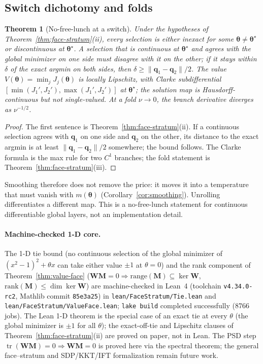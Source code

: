 \documentclass[conference]{IEEEtran}
\newtheorem{theorem}{Theorem}
\newcommand{\tr}{\operatorname{tr}}
\newcommand{\bq}{\bm{q}}
\newcommand{\bth}{\bm{\theta}}
\newcommand{\bW}{\bm{W}}
\newcommand{\bM}{\bm{M}}
\begin{document}
\subsection{Switch dichotomy and folds}
\begin{theorem}[No-free-lunch at a switch]
\label{thm:nfl}
Under the hypotheses of Theorem~\ref{thm:face-stratum}(ii), every selection is either inexact for some $\bth\ne\bth^\star$ or discontinuous at $\bth^\star$. A selection that is continuous at $\bth^\star$ and agrees with the global minimizer on one side must disagree with it on the other; if it stays within $\delta$ of the exact argmin on both sides, then $\delta\ge\|\bq_1-\bq_2\|/2$. The value $V(\bth)=\min_jJ_j(\bth)$ is locally Lipschitz, with Clarke subdifferential $[\min(J_1',J_2'),\max(J_1',J_2')]$ at $\bth^\star$; the solution map is Hausdorff-continuous but not single-valued. At a fold $\nu\to0$, the branch derivative diverges as $\nu^{-1/2}$.
\end{theorem}
\begin{proof}
The first sentence is Theorem~\ref{thm:face-stratum}(ii). If a continuous selection agrees with $\bq_1$ on one side and $\bq_2$ on the other, its distance to the exact argmin is at least $\|\bq_1-\bq_2\|/2$ somewhere; the bound follows. The Clarke formula is the max rule for two $C^1$ branches; the fold statement is Theorem~\ref{thm:face-stratum}(iii).
\end{proof}
Smoothing therefore does not remove the price: it moves it into a temperature that must vanish with $m(\bth)$ (Corollary~\ref{cor:smoothing}). Unrolling differentiates a different map. This is a no-free-lunch statement for continuous differentiable global layers, not an implementation detail.

\paragraph{Machine-checked 1-D core.} The 1-D tie bound (no continuous selection of the global minimizer of $(x^2-1)^2+\theta x$ can take either value $\pm1$ at $\theta=0$) and the rank component of Theorem~\ref{thm:value-face} ($\bW\bM=0\Rightarrow\mathrm{range}(\bM)\subseteq\ker\bW$, $\mathrm{rank}(\bM)\le\dim\ker\bW$) are machine-checked in Lean~4 (toolchain \texttt{v4.34.0-rc2}, Mathlib commit \texttt{85e3a25}) in \texttt{lean/FaceStratum/Tie.lean} and \texttt{lean/FaceStratum/ValueFace.lean}; \texttt{lake build} completed successfully (8766 jobs). The Lean 1-D theorem is the special case of an exact tie at every $\theta$ (the global minimizer is $\pm1$ for all $\theta$); the exact-off-tie and Lipschitz clauses of Theorem~\ref{thm:face-stratum}(ii) are proved on paper, not in Lean. The PSD step $\tr(\bW\bM)=0\Rightarrow\bW\bM=0$ is proved here via the spectral theorem; the general face--stratum and SDP/KKT/IFT formalization remain future work.
\end{document}
